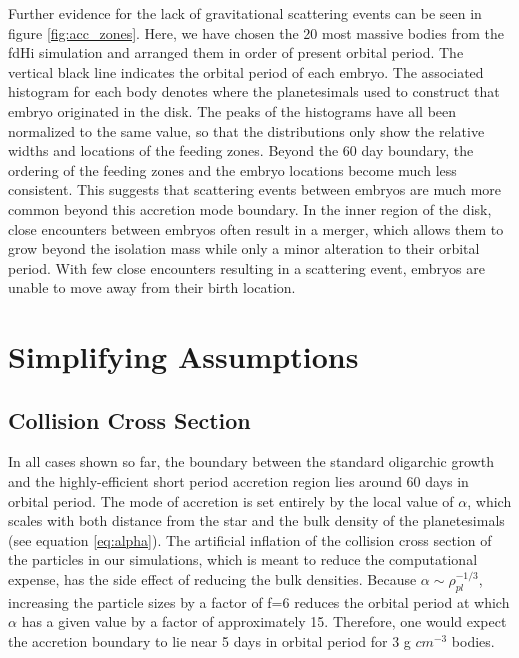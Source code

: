 \documentclass[twocolumn]{aastex63}
\begin{document}
Further evidence for the lack of gravitational scattering events can be seen in figure \ref{fig:acc_zones}. Here, we have chosen the 20 most massive bodies from the fdHi simulation and arranged them in order of present orbital period. The vertical black line indicates the orbital period of each embryo. The associated histogram for each body denotes where the planetesimals used to construct that embryo originated in the disk. The peaks of the histograms have all been normalized to the same value, so that the distributions only show the relative widths and locations of the feeding zones. Beyond the 60 day boundary, the ordering of the feeding zones and the embryo locations become much less consistent. This suggests that scattering events between embryos are much more common beyond this accretion mode boundary. In the inner region of the disk, close encounters between embryos often result in a merger, which allows them to grow beyond the isolation mass while only a minor alteration to their orbital period. With few close encounters resulting in a scattering event, embryos are unable to move away from their birth location.


\section{Simplifying Assumptions}\label{sec:assump}

\subsection{Collision Cross Section}

In all cases shown so far, the boundary between the standard oligarchic growth and the highly-efficient short period accretion region lies around 60 days in orbital period. The mode of accretion is set entirely by the local value of $\alpha$, which scales with both distance from the star and the bulk density of the planetesimals (see equation \ref{eq:alpha}). The artificial inflation of the collision cross section of the particles in our simulations, which is meant to reduce the computational expense, has the side effect of reducing the bulk densities. Because $\alpha \sim \rho_{pl}^{-1/3}$, increasing the particle sizes by a factor of f=6 reduces the orbital period at which $\alpha$ has a given value by a factor of approximately 15. Therefore, one would expect the accretion boundary to lie near 5 days in orbital period for 3 g $cm^{-3}$ bodies.
\end{document}
